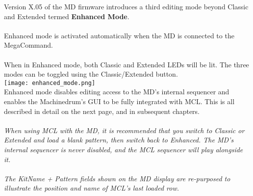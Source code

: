 Version X.05 of the MD firmware introduces a third editing mode beyond Classic and Extended termed \textbf{Enhanced Mode}.\\
\\
Enhanced mode is activated automatically when the MD is connected to the MegaCommand.\\
\\
When in Enhanced mode, both Classic and Extended LEDs will be lit. The three modes can be toggled using the Classic/Extended button.\\
\texttt{[image: enhanced\_mode.png]}\\
Enhanced mode disables editing access to the MD's internal sequencer and enables the Machinedrum's GUI to be fully integrated with MCL. This is all described in detail on the next page, and in subsequent chapters.
\\\\
\textit{When using MCL with the MD, it is recommended that you switch  to Classic or Extended and load a blank pattern, then switch back to Enhanced. The MD's internal sequencer is never disabled, and the MCL sequencer will play alongside it.\\\\
The KitName + Pattern fields shown on the MD display are re-purposed to illustrate the position and name of MCL's last loaded row.
}
\newpage
